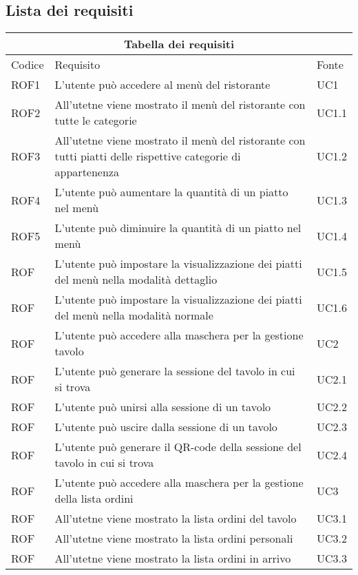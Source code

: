 \subsection{Lista dei requisiti}
\begin{center}
    \renewcommand{\arraystretch}{1.5}
    \begin{longtable}{ |p{1.5cm}|p{9cm}|p{1.5cm}|  }
        \hline
        \multicolumn{3}{|c|}{Tabella dei requisiti} \\
        \hline
        Codice&Requisito &Fonte \\
        \hline
        \endhead
        ROF1&L'utente può accedere al menù del ristorante&UC1 \\
        ROF2&All'utetne viene mostrato il menù del ristorante con tutte le categorie&UC1.1 \\
        ROF3&All'utetne viene mostrato il menù del ristorante con tutti piatti delle rispettive categorie di appartenenza&UC1.2 \\
        ROF4&L'utente può aumentare la quantità di un piatto nel menù&UC1.3 \\
        ROF5&L'utente può diminuire la quantità di un piatto nel menù&UC1.4 \\
        ROF&L'utente può impostare la visualizzazione dei piatti del menù nella modalità dettaglio&UC1.5 \\
        ROF&L'utente può impostare la visualizzazione dei piatti del menù nella modalità normale&UC1.6 \\
        ROF&L'utente può accedere alla maschera per la gestione tavolo &UC2 \\
        ROF&L'utente può generare la sessione del tavolo in cui si trova&UC2.1\\
        ROF&L'utente può unirsi alla sessione di un tavolo&UC2.2 \\
        ROF&L'utente può uscire dalla sessione di un tavolo&UC2.3\\
        ROF&L'utente può generare il QR-code della sessione del tavolo in cui si trova&UC2.4\\
        ROF&L'utente può accedere alla maschera per la gestione della lista ordini&UC3 \\
        ROF&All'utetne viene mostrato la lista ordini del tavolo&UC3.1 \\
        ROF&All'utetne viene mostrato la lista ordini personali &UC3.2 \\
        ROF&All'utetne viene mostrato la lista ordini in arrivo&UC3.3 \\

\end{longtable}
\end{center}
